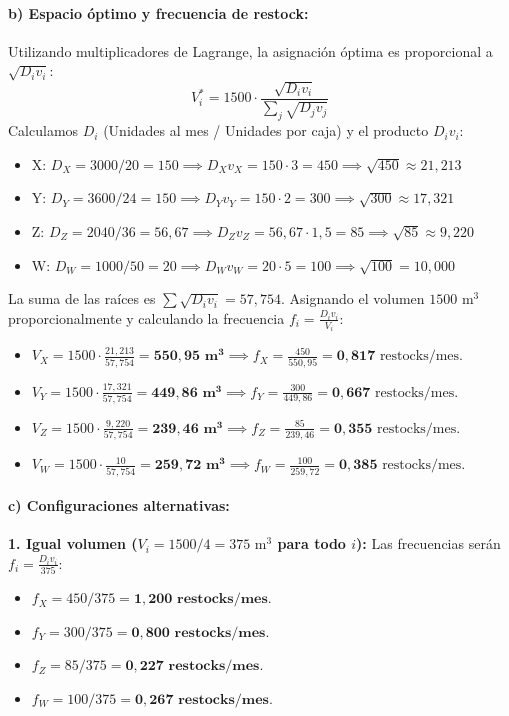 \documentclass[11pt]{article}
\begin{document}
\paragraph{b) Espacio óptimo y frecuencia de restock:}
Utilizando multiplicadores de Lagrange, la asignación óptima es proporcional a $\sqrt{D_i v_i}$:
$$ V_i^* = 1500 \cdot \frac{\sqrt{D_i v_i}}{\sum_j \sqrt{D_j v_j}} $$
Calculamos $D_i$ (Unidades al mes / Unidades por caja) y el producto $D_i v_i$:
\begin{itemize}
    \item X: $D_X = 3000 / 20 = 150 \implies D_X v_X = 150 \cdot 3 = 450 \implies \sqrt{450} \approx 21,213$
    \item Y: $D_Y = 3600 / 24 = 150 \implies D_Y v_Y = 150 \cdot 2 = 300 \implies \sqrt{300} \approx 17,321$
    \item Z: $D_Z = 2040 / 36 = 56,67 \implies D_Z v_Z = 56,67 \cdot 1,5 = 85 \implies \sqrt{85} \approx 9,220$
    \item W: $D_W = 1000 / 50 = 20 \implies D_W v_W = 20 \cdot 5 = 100 \implies \sqrt{100} = 10,000$
\end{itemize}
La suma de las raíces es $\sum \sqrt{D_i v_i} = 57,754$. Asignando el volumen $1500 \text{ m}^3$ proporcionalmente y calculando la frecuencia $f_i = \frac{D_i v_i}{V_i}$:
\begin{itemize}
    \item $V_X = 1500 \cdot \frac{21,213}{57,754} = \mathbf{550,95 \text{ m}^3} \implies f_X = \frac{450}{550,95} = \mathbf{0,817} \text{ restocks/mes}$.
    \item $V_Y = 1500 \cdot \frac{17,321}{57,754} = \mathbf{449,86 \text{ m}^3} \implies f_Y = \frac{300}{449,86} = \mathbf{0,667} \text{ restocks/mes}$.
    \item $V_Z = 1500 \cdot \frac{9,220}{57,754} = \mathbf{239,46 \text{ m}^3} \implies f_Z = \frac{85}{239,46} = \mathbf{0,355} \text{ restocks/mes}$.
    \item $V_W = 1500 \cdot \frac{10}{57,754} = \mathbf{259,72 \text{ m}^3} \implies f_W = \frac{100}{259,72} = \mathbf{0,385} \text{ restocks/mes}$.
\end{itemize}

\paragraph{c) Configuraciones alternativas:}
\textbf{1. Igual volumen ($V_i = 1500/4 = 375 \text{ m}^3$ para todo $i$):}
Las frecuencias serán $f_i = \frac{D_i v_i}{375}$:
\begin{itemize}
    \item $f_X = 450 / 375 = \mathbf{1,200 \text{ restocks/mes}}$.
    \item $f_Y = 300 / 375 = \mathbf{0,800 \text{ restocks/mes}}$.
    \item $f_Z = 85 / 375 = \mathbf{0,227 \text{ restocks/mes}}$.
    \item $f_W = 100 / 375 = \mathbf{0,267 \text{ restocks/mes}}$.
\end{itemize}
\end{document}
